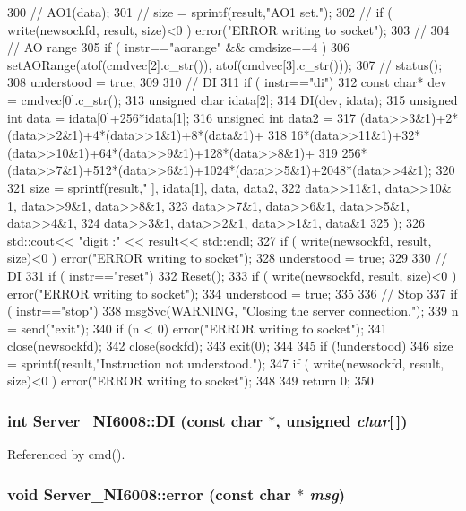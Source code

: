 \begin{DoxyCode}
{{300   //   AO1(data);
301   //   size = sprintf(result,"AO1 set.");
302   //   if ( write(newsockfd, result, size)<0 ) error("ERROR writing to socket");
303   // }
304   // AO range 
305   if ( instr=="aorange" && cmdsize==4 ){
306     setAORange(atof(cmdvec[2].c_str()), atof(cmdvec[3].c_str()));
307     //    status();
308     understood = true;
309   }
310   // DI
311   if ( instr=="di"){
312     const char* dev = cmdvec[0].c_str();
313     unsigned char idata[2];
314     DI(dev, idata);
315     unsigned int data = idata[0]+256*idata[1];
316     unsigned int data2 = 
317       (data>>3&1)+2*(data>>2&1)+4*(data>>1&1)+8*(data&1)+
318       16*(data>>11&1)+32*(data>>10&1)+64*(data>>9&1)+128*(data>>8&1)+
319       256*(data>>7&1)+512*(data>>6&1)+1024*(data>>5&1)+2048*(data>>4&1);
320 
321     size = sprintf(result,"%
      ], idata[1], data, data2,  
322            data>>11&1, data>>10& 1, data>>9&1, data>>8&1,
323            data>>7&1, data>>6&1, data>>5&1, data>>4&1,
324            data>>3&1, data>>2&1, data>>1&1, data&1
325            );
326     std::cout<< "digit :" << result<< std::endl;
327     if ( write(newsockfd, result, size)<0 ) error("ERROR writing to socket");
328     understood = true;
329   }
330   // DI
331   if ( instr=="reset"){
332     Reset();
333     if ( write(newsockfd, result, size)<0 ) error("ERROR writing to socket");
334     understood = true; 
335   }
336   // Stop
337   if ( instr=="stop"){
338     msgSvc(WARNING, "Closing the server connection.");
339     n = send("exit");
340     if (n < 0) error("ERROR writing to socket");
341     close(newsockfd);
342     close(sockfd);
343     exit(0);
344   }
345   if (!understood){
346     size = sprintf(result,"Instruction not understood.");
347     if ( write(newsockfd, result, size)<0 ) error("ERROR writing to socket");
348   }
349   return 0; 
350 }
\end{DoxyCode}
\hypertarget{classServer__NI6008_a76b7491d11244e43a2fdb6d4783bd0f8}{
\subsubsection[{DI}]{\setlength{\rightskip}{0pt plus 5cm}int Server\_\-NI6008::DI (const char $\ast$, \/  unsigned {\em char}\mbox{[}$\,$\mbox{]})}}
\label{classServer__NI6008_a76b7491d11244e43a2fdb6d4783bd0f8}


Referenced by cmd().\hypertarget{classServer__NI6008_a7bcfa6ba683c63b68c624644ccfb8597}{
\subsubsection[{error}]{\setlength{\rightskip}{0pt plus 5cm}void Server\_\-NI6008::error (const char $\ast$ {\em msg})}}
\label{classServer__NI6008_a7bcfa6ba683c63b68c624644ccfb8597}


